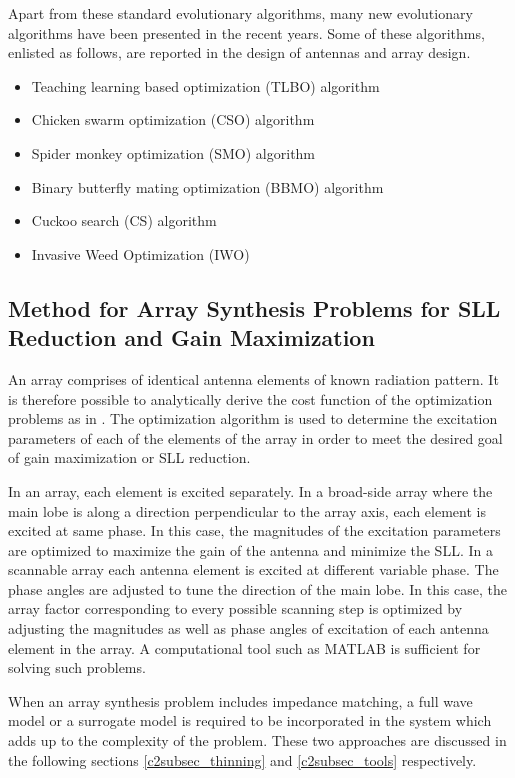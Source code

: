 Apart from these standard evolutionary algorithms, many new evolutionary algorithms have been presented in the recent years. Some of these algorithms, enlisted as follows, are reported in the design of antennas and array design.

\begin{itemize}
\item Teaching learning based optimization (TLBO) algorithm \cite{arraySynth3}
\item Chicken swarm optimization (CSO) algorithm \cite{arraySynth4}
\item Spider monkey optimization (SMO) algorithm \cite{arrayThin1}
\item Binary butterfly mating optimization (BBMO) algorithm \cite{arrayThin2}
\item Cuckoo search (CS) algorithm \cite{CuckooSerach}
\item Invasive Weed Optimization (IWO) \cite{InvasiveWeed}
\end{itemize}

\subsection{Method for Array Synthesis Problems for SLL Reduction and Gain Maximization} \label{c2subsec_sll_methods}
An array comprises of identical antenna elements of known radiation pattern. It is therefore possible to analytically derive the cost function of the optimization problems as in \cite{arraySynth2, arraySynth3, arraySynth4, compCAD4Arry}. The optimization algorithm is used to determine the excitation parameters of each of the elements of the array in order to meet the desired goal of gain maximization or SLL reduction.

In an array, each element is excited separately. In a broad-side array where the main lobe is along a direction perpendicular to the array axis, each element is excited at same phase. In this case, the magnitudes of the excitation parameters are optimized to maximize the gain of the antenna and minimize the SLL. In a scannable array each antenna element is excited at different variable phase. The phase angles are adjusted to tune the direction of the main lobe. In this case, the array factor corresponding to every possible scanning step is optimized by adjusting the magnitudes as well as phase angles of excitation of each antenna element in the array. A computational tool such as MATLAB is sufficient for solving such problems.

When an array synthesis problem includes impedance matching, a full wave model or a surrogate model is required to be incorporated in the system which adds up to the complexity of the problem. These two approaches are discussed in the following sections \ref{c2subsec_thinning} and \ref{c2subsec_tools} respectively.


